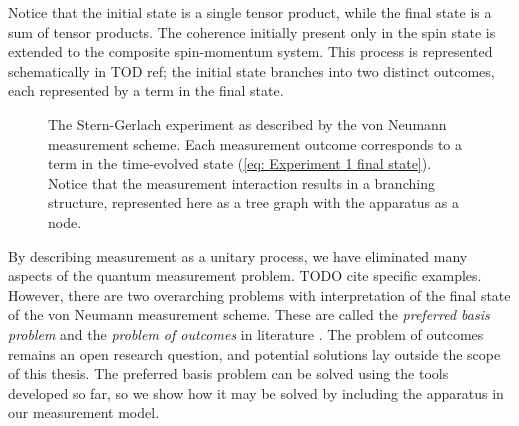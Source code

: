Notice that the initial state is a single tensor product, while the final state is a sum of tensor products. The coherence initially present only in the spin state is extended to the composite spin-momentum system. This process is represented schematically in TOD ref; the initial state branches into two distinct outcomes, each represented by a term in the final state.

\begin{figure}
\centering\CaptionFontSize
{}

\caption[Insert an abbreviated caption here to show in the List of Figures]
{The Stern-Gerlach experiment as described by the von Neumann measurement scheme. Each measurement outcome corresponds to a term in the time-evolved state (\autoref{eq: Experiment 1 final state}). Notice that the measurement interaction results in a branching structure, represented here as a tree graph with the apparatus as a node.}
\label{Figure:Measurement:DetectorStates}
\end{figure}

By describing measurement as a unitary process, we have eliminated many aspects of the quantum measurement problem. TODO cite specific examples. However, there are two overarching problems with interpretation of the final state of the von Neumann measurement scheme. These are called the \textit{preferred basis problem} and the \textit{problem of outcomes} in literature \cite{Schlosshauer}\cite{Wang}. The problem of outcomes remains an open research question, and potential solutions lay outside the scope of this thesis. The preferred basis problem can be solved using the tools developed so far, so we show how it may be solved by including the apparatus in our measurement model.

